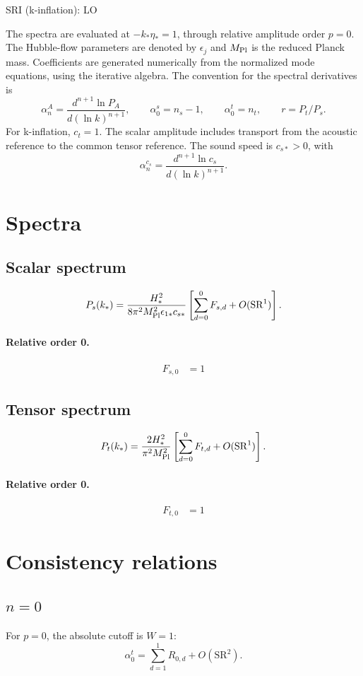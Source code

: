 \documentclass[10pt]{article}
\begin{document}
\begin{center}\Large SRI (k-inflation): LO\end{center}
The spectra are evaluated at $-k_*\eta_*=1$, through relative amplitude
order $p=0$. The Hubble-flow parameters are denoted by $\epsilon_j$
and $M_{\rm Pl}$ is the reduced Planck mass. Coefficients are generated
numerically from the normalized mode equations, using the iterative algebra.
The convention for the spectral derivatives is
\[
\alpha_n^A=\frac{d^{n+1}\ln P_A}{d(\ln k)^{n+1}},\qquad
\alpha_0^s=n_s-1,\qquad\alpha_0^t=n_t,\qquad r=P_t/P_s.
\]
For k-inflation, $c_t=1$. The scalar amplitude includes transport from the acoustic reference to the common tensor reference. The sound speed is $c_{s*}>0$, with
\[\alpha_n^{c_s}=\frac{d^{n+1}\ln c_s}{d(\ln k)^{n+1}}.\]
\section{Spectra}

\subsection{Scalar spectrum}
\[P_s(k_*)=\frac{H_*^2}{8\pi^2M_{\rm Pl}^2\epsilon_{1*}c_{s*}}\left[\sum_{d=0}^{0}F_{s,d}+O(\mathrm{SR}^{1})\right].\]
\paragraph{Relative order 0.}
\begin{align*}
F_{s,0} &= 1
\end{align*}

\subsection{Tensor spectrum}
\[P_t(k_*)=\frac{2H_*^2}{\pi^2M_{\rm Pl}^2}\left[\sum_{d=0}^{0}F_{t,d}+O(\mathrm{SR}^{1})\right].\]
\paragraph{Relative order 0.}
\begin{align*}
F_{t,0} &= 1
\end{align*}

\section{Consistency relations}
\subsection{$n=0$}
For $p=0$, the absolute cutoff is $W=1$:
\[\alpha_{0}^t=\sum_{d=1}^{1}R_{0,d}+O(\mathrm{SR}^{2}).\]
\end{document}
